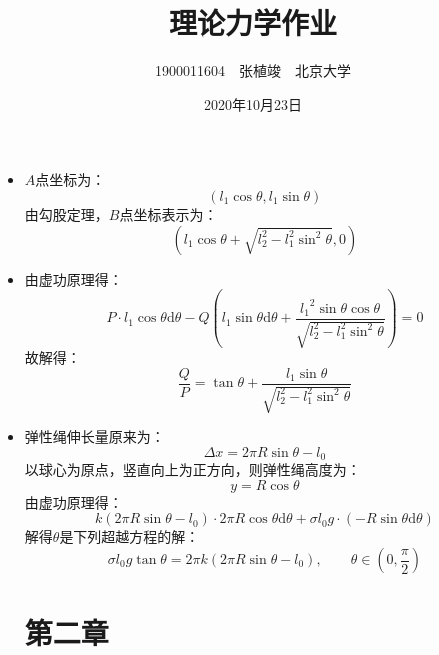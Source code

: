 \documentclass[a4paper,fontset=windows]{ctexart}
\begin{document}
    \title{\textbf{理论力学作业}}
    \author{1900011604\ \ 张植竣\ \ 北京大学}
    \date{2020年10月23日}

    \maketitle

    \begin{itemize}

        \section*{第一章}

        \item[1.(a)]
        $A$点坐标为：
        \[
        (l_1\cos\theta, l_1\sin\theta)
        \]
        由勾股定理，$B$点坐标表示为：
        \[
        (l_1\cos\theta + \sqrt{l_2^2 - l_1^2\sin^2\theta}, 0)
        \]
        \medskip

        \item[1.(b)]
        由虚功原理得：
        \[
        P\cdot l_1\cos\theta\mathrm{d}\theta - Q\left(l_1\sin\theta\mathrm{d}\theta + \frac{{l_1}^2\sin\theta\cos\theta}{\sqrt{l_2^2 - l_1^2\sin^2\theta}}\right) = 0
        \]
        故解得：
        \[
        \frac{Q}{P} = \tan\theta + \frac{{l_1}\sin\theta}{\sqrt{l_2^2 - l_1^2\sin^2\theta}}
        \]
        \bigskip

        \item[2.]
        弹性绳伸长量原来为：
        \[
        \Delta x = 2\pi R\sin\theta - l_0
        \]
        以球心为原点，竖直向上为正方向，则弹性绳高度为：
        \[
        y = R\cos\theta
        \]
        由虚功原理得：
        \[
        k(2\pi R\sin\theta - l_0)\cdot2\pi R\cos\theta\mathrm{d}\theta + \sigma l_0 g\cdot(-R\sin\theta\mathrm{d}\theta)
        \]
        解得$\theta$是下列超越方程的解：
        \[
        \sigma l_0 g\tan\theta = 2\pi k(2\pi R\sin\theta - l_0),\qquad
        \theta\in(0,\frac{\pi}{2})
        \]

        \newpage
        \section*{第二章}


\end{itemize}
\end{document}
